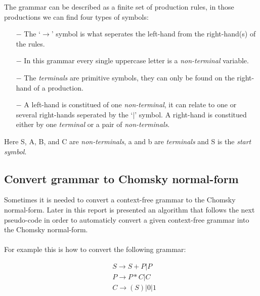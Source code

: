 The grammar can be described as a finite set of production rules, in those productions we can find four types of symbols:

\begin{itemize}
    \item[$-$] The `$\to$' symbol is what seperates the left-hand from the right-hand(s) of the rules.
    \item[$-$] In this grammar every single uppercase letter is a \textit{non-terminal} variable.
    \item[$-$] The \textit{terminals} are primitive symbols, they can only be found on the right-hand of a production.
    \item[$-$] A left-hand is constitued of one \textit{non-terminal}, it can relate to one or several right-hands seperated by the `$|$' symbol. A right-hand is constitued either by one \textit{terminal} or a pair of \textit{non-terminals}.
\end{itemize}

Here S, A, B, and C are \textit{non-terminals}, a and b are \textit{terminals} and S is the \textit{start symbol}.

\subsection{Convert grammar to Chomsky normal-form}

Sometimes it is needed to convert a context-free grammar to the Chomsky normal-form.
Later in this report is presented an algorithm that follows the next pseudo-code in order to automaticly convert a given context-free grammar into the Chomsky normal-form.
\\
\\
For example this is how to convert the following grammar:

\begin{align*} 
&S \to S+P|P\\
&P \to P*C|C\\
&C \to (S)|0|1\\
\end{align*}

